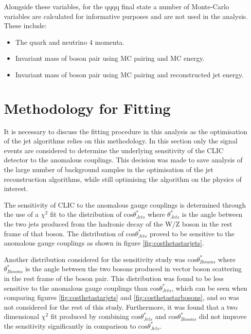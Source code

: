 Alongside these variables, for the \nu{\nu}qqqq final state a number of Monte-Carlo variables are calculated for informative purposes and are not used in the analysis. These include:
\begin{itemize}
\item The quark and neutrino 4 momenta.
\item Invariant mass of boson pair using MC pairing and MC energy.
\item Invariant mass of boson pair using MC pairing and reconstructed jet energy.
\end{itemize}

\section{Methodology for Fitting}
It is necessary to discuss the fitting procedure in this analysis as the optimisation of the jet algorithms relies on this methodology. In this section only the signal events are considered to determine the underlying sensitivity of the CLIC detector to the anomalous couplings. This decision was made to save analysis of the large number of background samples in the optimisation of the jet reconstruction algorithms, while still optimising the algorithm on the physics of interest.

The sensitivity of CLIC to the anomalous gauge couplings is determined through the use of a $\chi^{2}$ fit to the distribution of $\text{cos}\theta^{*}_{Jets}$ where $\theta^{*}_{Jets}$ is the angle between the two jets produced from the hadronic decay of the W/Z boson in the rest frame of that boson.  The distribution of $\text{cos}\theta^{*}_{Jets}$ proved to be sensitive to the anomalous gauge couplings as shown in figure \ref{fig:costhetastarjets}.

Another distribution considered for the sensitivity study was  $\text{cos}\theta^{*}_{Bosons}$ where $\theta^{*}_{Bosons}$ is the angle between the two bosons produced in vector boson scattering in the rest frame of the boson pair.  This distribution was found to be less sensitive to the anomalous gauge couplings than $\text{cos}\theta^{*}_{Jets}$, which can be seen when comparing figures \ref{fig:costhetastarjets} and \ref{fig:costhetastarbosons}, and so was not considered for the rest of this study.  Furthermore, it was found that a two dimensional $\chi^{2}$ fit produced by combining $\text{cos}\theta^{*}_{Jets}$ and $\text{cos}\theta^{*}_{Bosons}$ did not improve the sensitivity significantly in comparison to $\text{cos}\theta^{*}_{Jets}$.

